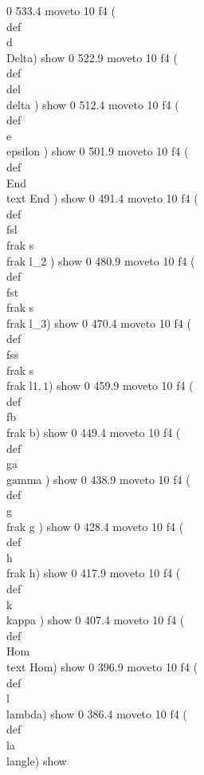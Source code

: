 0 533.4 moveto
10 f4
(\\def \\d {\\Delta}) show
0 522.9 moveto
10 f4
(\\def \\del {\\delta} ) show
0 512.4 moveto
10 f4
(\\def \\e {\\epsilon} ) show
0 501.9 moveto
10 f4
(\\def \\End {{\\text {End}}} ) show
0 491.4 moveto
10 f4
(\\def\\fsl{\\frak s\\frak l_2} ) show
0 480.9 moveto
10 f4
(\\def\\fst{\\frak s\\frak l_3}) show
0 470.4 moveto
10 f4
(\\def\\fss{\\frak s\\frak l\(1,1\)}) show
0 459.9 moveto
10 f4
(\\def \\fb {{\\frak b}}) show
0 449.4 moveto
10 f4
(\\def \\ga {\\gamma}  ) show
0 438.9 moveto
10 f4
(\\def \\g {{\\frak g}} ) show
0 428.4 moveto
10 f4
(\\def \\h {{\\frak h}}) show
0 417.9 moveto
10 f4
(\\def \\k {\\kappa} ) show
0 407.4 moveto
10 f4
(\\def \\Hom {{\\text {Hom}}}) show
0 396.9 moveto
10 f4
(\\def \\l {\\lambda}) show
0 386.4 moveto
10 f4
(\\def \\la {\\langle}) show
